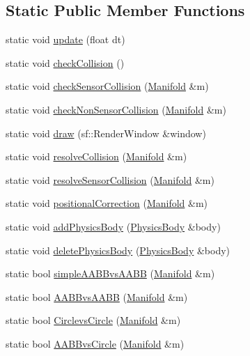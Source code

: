 \subsection*{Static Public Member Functions}
\begin{DoxyCompactItemize}
\item 
static void \mbox{\hyperlink{class_physics_handler_aae72efd60617fe4f99f0973245834419}{update}} (float dt)
\item 
static void \mbox{\hyperlink{class_physics_handler_a59608df05a59b284957c2a06a3714a90}{check\+Collision}} ()
\item 
static void \mbox{\hyperlink{class_physics_handler_a1f62975783786feee0c95d8ad4aa741f}{check\+Sensor\+Collision}} (\mbox{\hyperlink{struct_physics_handler_1_1_manifold}{Manifold}} \&m)
\item 
static void \mbox{\hyperlink{class_physics_handler_ae602274d78112796fa9ef3466485d9fd}{check\+Non\+Sensor\+Collision}} (\mbox{\hyperlink{struct_physics_handler_1_1_manifold}{Manifold}} \&m)
\item 
static void \mbox{\hyperlink{class_physics_handler_a4d9a53f320f6a6136b3e8cfb7388310d}{draw}} (sf\+::\+Render\+Window \&window)
\item 
static void \mbox{\hyperlink{class_physics_handler_a43422655392a4b669bd57445d049531b}{resolve\+Collision}} (\mbox{\hyperlink{struct_physics_handler_1_1_manifold}{Manifold}} \&m)
\item 
static void \mbox{\hyperlink{class_physics_handler_a21e6ab8bd30b5659639e1ba8cecc9410}{resolve\+Sensor\+Collision}} (\mbox{\hyperlink{struct_physics_handler_1_1_manifold}{Manifold}} \&m)
\item 
static void \mbox{\hyperlink{class_physics_handler_a936a971e834ed56067bfa1910fb1ae87}{positional\+Correction}} (\mbox{\hyperlink{struct_physics_handler_1_1_manifold}{Manifold}} \&m)
\item 
static void \mbox{\hyperlink{class_physics_handler_a4453d3ae6415361558c0bd8e298209b5}{add\+Physics\+Body}} (\mbox{\hyperlink{class_physics_body}{Physics\+Body}} \&body)
\item 
static void \mbox{\hyperlink{class_physics_handler_a8d7629bae0011da602423f003015b3ba}{delete\+Physics\+Body}} (\mbox{\hyperlink{class_physics_body}{Physics\+Body}} \&body)
\item 
static bool \mbox{\hyperlink{class_physics_handler_aefa13520fd0f2a95d03e729aac275c86}{simple\+A\+A\+B\+Bvs\+A\+A\+BB}} (\mbox{\hyperlink{struct_physics_handler_1_1_manifold}{Manifold}} \&m)
\item 
static bool \mbox{\hyperlink{class_physics_handler_a6e468ad8e5d6f5c5a895ea76a107333f}{A\+A\+B\+Bvs\+A\+A\+BB}} (\mbox{\hyperlink{struct_physics_handler_1_1_manifold}{Manifold}} \&m)
\item 
static bool \mbox{\hyperlink{class_physics_handler_a994d8fc01e32b5fe76bfd32b2645082b}{Circlevs\+Circle}} (\mbox{\hyperlink{struct_physics_handler_1_1_manifold}{Manifold}} \&m)
\item 
static bool \mbox{\hyperlink{class_physics_handler_a68b7c4ba8a3c7188f6e4c5cb61eb431d}{A\+A\+B\+Bvs\+Circle}} (\mbox{\hyperlink{struct_physics_handler_1_1_manifold}{Manifold}} \&m)
\end{DoxyCompactItemize}


